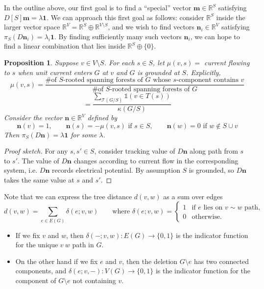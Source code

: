 \documentclass{amsart}
\newtheorem{prop}[thm]{Proposition}
\theoremstyle{definition}
\newcommand{\RR}{\mathbb{R}}
\newcommand{\trees}{\mathcal{T}}
\begin{document}
In the outline above, our first goal is to find a ``special'' vector $ \mathbf{m}\in \RR^S$ satisfying $D[S] \mathbf{m} = \lambda \mathbf{1}$.
We can approach this first goal as follows: 
consider $\RR^S$ inside the larger vector space $\RR^V = \RR^S \oplus \RR^{V\setminus S}$,
and we wish to find vectors $\mathbf{n}_i \in \RR^{V}$ satisfying
$\pi_S( D \mathbf{n}_i) = \lambda_i \mathbf{1}$.
By finding sufficiently many such vectors $\mathbf{n}_i$,
we can hope to find a linear combination that lies inside $\RR^S \oplus \{0\}$.

\begin{prop}
Suppose $v \in V \setminus S$.
For each $s \in S$, let $\mu(v,s) = $ current flowing to $s$
when unit current enters $G$ at $v$ and $G$ is grounded at $S$.
Explicitly,
\begin{equation*}
\mu(v,s) =  \frac{\text{\# of $S$-rooted spanning forests of $G$ whose $s$-component contains $v$}}{\text{\# of $S$-rooted spanning forests of $G$}}
\end{equation*}
$$
= \frac{\sum_{\trees(G/S)} \mathds{1}(v \in T(s))}{\kappa(G/S)}
$$
Consider the vector $\mathbf{n} \in \RR^V$ defined by
$$
\mathbf{n}(v) = 1,\qquad
\mathbf{n}(s) = -\mu(v,s) \text{ if }s \in S, \qquad
\mathbf{n}(w) = 0 \text{ if } w \not\in S \cup v
$$
Then $\pi_S( D \mathbf{n}) = \lambda \mathbf{1}$ for some $\lambda$.
\end{prop}
\begin{proof}[Proof sketch]
For any $s, s' \in S$, consider tracking value of $D \mathbf{n}$ along path from $s$ to $s'$. 
The value of $D \mathbf{n}$ changes according to current flow in the corresponding system, i.e. $D \mathbf{n}$ records electrical potential.
By assumption $S$ is grounded, so $D\mathbf{n}$ takes the same value at $s$ and $s'$.
\end{proof}


Note that we can express the tree distance $d(v,w)$ as a sum over edges
\begin{equation*}
d(v,w) = \sum_{e \in E(G)} \delta(e; v,w)
\qquad\text{where } \delta(e; v,w) = \begin{cases}
1 &\text{if $e$ lies on $v\sim w$ path}, \\
0 &\text{otherwise}.
\end{cases}
\end{equation*}
\begin{itemize}
\item 
If we fix $v$ and $w$, then $\delta(-;v,w) : E(G) \to \{0,1\}$
is the indicator function for the unique $v~ w$ path in $G$.

\item 
On the other hand if we fix $e$ and $v$,
then the deletion $G\setminus e$ has two connected components,
and $\delta(e;v, -) : V(G) \to \{0,1\}$ 
is the indicator function for the component of $G \setminus e$ not containing $v$.
\end{itemize}
\end{document}
